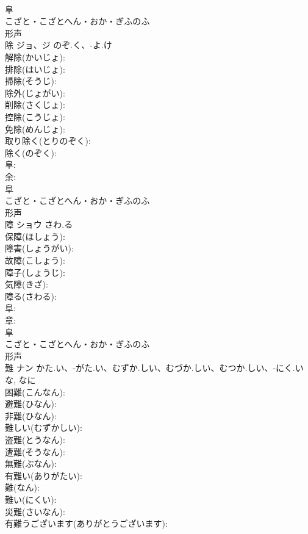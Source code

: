 \documentclass[8pt]{extreport}
\begin{document}
\begin{CJK}{UTF8}{min}
\\	阜	
\\	こざと・こざとへん・おか・ぎふのふ	
\\	形声 
\\	除	ジョ、ジ	のぞ.く、-よ.け		
\\	解除(かいじょ): 
\\	排除(はいじょ): 
\\	掃除(そうじ): 
\\	除外(じょがい): 
\\	削除(さくじょ): 
\\	控除(こうじょ): 
\\	免除(めんじょ): 
\\	取り除く(とりのぞく): 
\\	除く(のぞく): 
\\	阜: 
\\	余: 
\\	阜	
\\	こざと・こざとへん・おか・ぎふのふ	
\\	形声 
\\	障	ショウ	さわ.る		
\\	保障(ほしょう): 
\\	障害(しょうがい): 
\\	故障(こしょう): 
\\	障子(しょうじ): 
\\	気障(きざ): 
\\	障る(さわる): 
\\	阜: 
\\	章: 
\\	阜	
\\	こざと・こざとへん・おか・ぎふのふ	
\\	形声 
\\	難	ナン	かた.い、-がた.い、むずか.しい、むづか.しい、むつか.しい、-にく.い	な, なに	
\\	困難(こんなん): 
\\	避難(ひなん): 
\\	非難(ひなん): 
\\	難しい(むずかしい): 
\\	盗難(とうなん): 
\\	遭難(そうなん): 
\\	無難(ぶなん): 
\\	有難い(ありがたい): 
\\	難(なん): 
\\	難い(にくい): 
\\	災難(さいなん): 
\\	有難うございます(ありがとうございます): 

\end{CJK}
\end{document}
